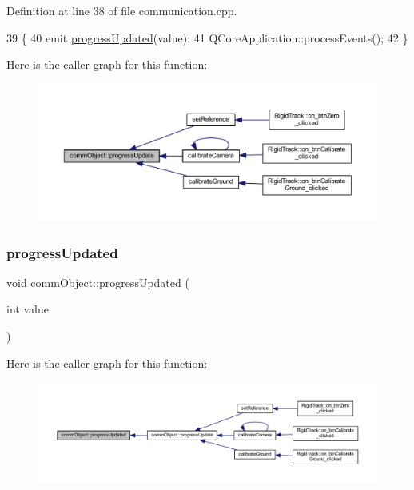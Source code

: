 Definition at line 38 of file communication.\+cpp.


\begin{DoxyCode}
39 \{
40     emit \hyperlink{classcomm_object_a6039d306f25a6b46c78942edf9cee662}{progressUpdated}(value);
41     QCoreApplication::processEvents();
42 \}
\end{DoxyCode}
Here is the caller graph for this function\+:
\nopagebreak
\begin{figure}[H]
\begin{center}
\leavevmode
\includegraphics[width=350pt]{classcomm_object_acfc97f4310e2b7d841ecb8cf8be0088e_icgraph}
\end{center}
\end{figure}
\mbox{\label{classcomm_object_a6039d306f25a6b46c78942edf9cee662}} 
\subsubsection{\texorpdfstring{progress\+Updated}{progressUpdated}}
{\footnotesize\ttfamily void comm\+Object\+::progress\+Updated (\begin{DoxyParamCaption}\item[{int}]{value }\end{DoxyParamCaption})\hspace{0.3cm}{\ttfamily [signal]}}

Here is the caller graph for this function\+:
\nopagebreak
\begin{figure}[H]
\begin{center}
\leavevmode
\includegraphics[width=350pt]{classcomm_object_a6039d306f25a6b46c78942edf9cee662_icgraph}
\end{center}
\end{figure}
\mbox{\label{classcomm_object_adccf5b5946d35d5cf6d76f367f93e335}} 
